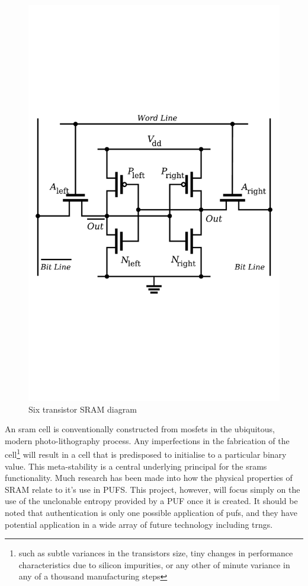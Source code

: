 \begin{figure}
  \centering
  \includegraphics[scale=0.4, trim=0 300 0 300, clip]{images/sram}
  \caption{Six transistor SRAM diagram}
  \label{fig:sram}
\end{figure}

An \gls{sram} cell is conventionally constructed from \glspl{mosfet} in the
ubiquitous, modern photo-lithography process.
Any imperfections in the fabrication of the cell\footnote{such as subtle
variances in the transistors size, tiny changes in performance
characteristics due to silicon impurities, or any other of minute variance in
any of a thousand manufacturing steps} will result in a cell that is
predisposed to initialise to a particular binary value.
This meta-stability is a central underlying principal for the \glspl{sram}
functionality. Much research has been made into how the physical properties
of SRAM relate to it's use in
PUFS\cite{vandenberg2013analysis, maiti2013compare,maes201265nm}.
This project, however, will focus simply on the use of the unclonable entropy provided
by a PUF once it is created. It should be noted that authentication is only one
possible application of \glspl{puf}, and they have potential application in a wide
array of future technology including \glspl{trng}.

